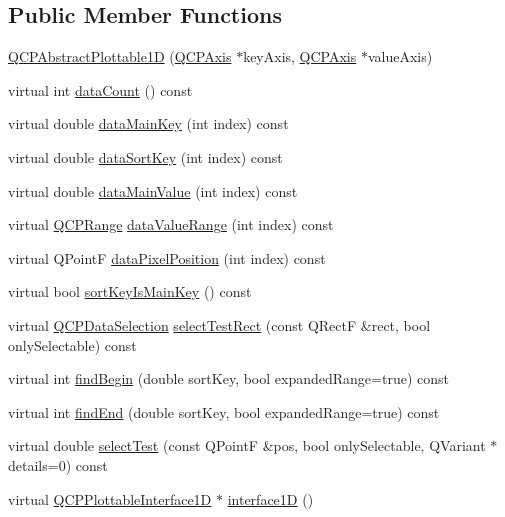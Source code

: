 \subsection*{Public Member Functions}
\begin{DoxyCompactItemize}
\item 
\hyperlink{class_q_c_p_abstract_plottable1_d_a30b2e50ab0afce65f104ea7a95440315}{Q\+C\+P\+Abstract\+Plottable1D} (\hyperlink{class_q_c_p_axis}{Q\+C\+P\+Axis} $\ast$key\+Axis, \hyperlink{class_q_c_p_axis}{Q\+C\+P\+Axis} $\ast$value\+Axis)
\item 
virtual int \hyperlink{class_q_c_p_abstract_plottable1_d_a354545da303458283df3f7948a7a768b}{data\+Count} () const
\item 
virtual double \hyperlink{class_q_c_p_abstract_plottable1_d_ab14ab428595856bf76e04499017fa8dc}{data\+Main\+Key} (int index) const
\item 
virtual double \hyperlink{class_q_c_p_abstract_plottable1_d_a6fce4e684f33a31c45928899b5d9ab4b}{data\+Sort\+Key} (int index) const
\item 
virtual double \hyperlink{class_q_c_p_abstract_plottable1_d_a0f913bb0889ca7cb574657a078fc8cff}{data\+Main\+Value} (int index) const
\item 
virtual \hyperlink{class_q_c_p_range}{Q\+C\+P\+Range} \hyperlink{class_q_c_p_abstract_plottable1_d_ac6201b01aee550ef0a240183781d1f9a}{data\+Value\+Range} (int index) const
\item 
virtual Q\+PointF \hyperlink{class_q_c_p_abstract_plottable1_d_a14cf167457cda163575e6eec2a0b178d}{data\+Pixel\+Position} (int index) const
\item 
virtual bool \hyperlink{class_q_c_p_abstract_plottable1_d_a022e8905f5a667d8379493d6a037e79f}{sort\+Key\+Is\+Main\+Key} () const
\item 
virtual \hyperlink{class_q_c_p_data_selection}{Q\+C\+P\+Data\+Selection} \hyperlink{class_q_c_p_abstract_plottable1_d_ac385c38a79e419ed3600c2ee398fd216}{select\+Test\+Rect} (const Q\+RectF \&rect, bool only\+Selectable) const
\item 
virtual int \hyperlink{class_q_c_p_abstract_plottable1_d_ae6ead74a0d6a17954e1857f361b9ccf2}{find\+Begin} (double sort\+Key, bool expanded\+Range=true) const
\item 
virtual int \hyperlink{class_q_c_p_abstract_plottable1_d_ad913df7f02add35150779dce3913aeae}{find\+End} (double sort\+Key, bool expanded\+Range=true) const
\item 
virtual double \hyperlink{class_q_c_p_abstract_plottable1_d_a071e2df66ba1746067dfcb5e27947b43}{select\+Test} (const Q\+PointF \&pos, bool only\+Selectable, Q\+Variant $\ast$details=0) const
\item 
virtual \hyperlink{class_q_c_p_plottable_interface1_d}{Q\+C\+P\+Plottable\+Interface1D} $\ast$ \hyperlink{class_q_c_p_abstract_plottable1_d_a3ab7511c279af967955369606c584dd6}{interface1D} ()
\end{DoxyCompactItemize}
